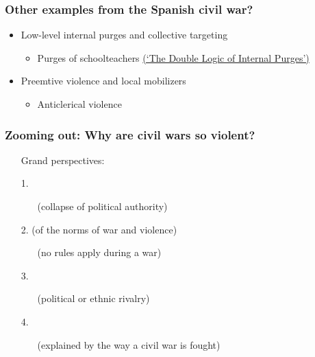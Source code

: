 \documentclass[aspectratio=43]{beamer}
\begin{document}
\begin{frame}
\frametitle{Other examples from the Spanish civil war?}
\centering

\begin{itemize}
  \item Low-level internal purges and collective targeting
  \begin{itemize}
    \item Purges of schoolteachers \href{https://www.tandfonline.com/doi/abs/10.1080/13537113.2020.1795451}{\scriptsize (`The Double Logic of Internal Purges')}
  \end{itemize}
  \item Preemtive violence and local mobilizers
  \begin{itemize}
    \item Anticlerical violence %
  \end{itemize}
\end{itemize}

\end{frame}

\begin{frame}
\frametitle{Zooming out: Why are civil wars so violent?}
\centering

\begin{itemize}
  \item[] Grand perspectives:
  \item[1.] 
  \begin{itemize}
    \item[] {\small (collapse of political authority)}
  \end{itemize}
  \item[2.]  (of the norms of war and violence)
  \begin{itemize}
    \item[] {\small (no rules apply during a war)}
  \end{itemize}
  \item[3.] 
  \begin{itemize}
    \item[] {\small (political or ethnic rivalry)}
  \end{itemize}
  \item[4.] 
  \begin{itemize}
    \item[] {\small (explained by the way a civil war is fought)}
  \end{itemize}
\end{itemize}

\end{frame}
\end{document}
